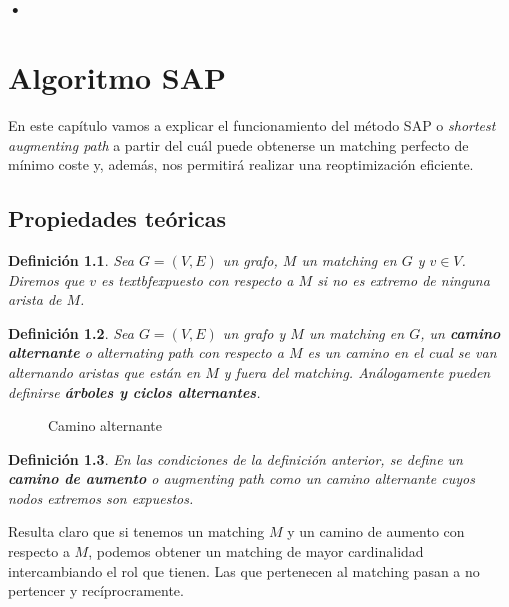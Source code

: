 \documentclass[twoside,a4paper,openright,12pt]{book}
\newtheorem{defi}{Definici\'on}[section]
\begin{document}
\subsection{•}

\chapter{Algoritmo SAP}
En este capítulo vamos a explicar el funcionamiento del método SAP o \textit{shortest augmenting path} a partir del cuál puede obtenerse un matching perfecto de mínimo coste y, además, nos permitirá realizar una reoptimización eficiente.
\section{Propiedades teóricas}
\begin{defi}
Sea $G=(V,E)$ un grafo, $M$ un matching en $G$ y $v\in V$. Diremos que $v$ es textbf{expuesto} con respecto a $M$ si no es extremo de ninguna arista de $M$.
\end{defi}
\begin{defi}
Sea $G=(V,E)$ un grafo y $M$ un matching en $G$, un \textbf{camino alternante} o \textit{alternating path} con respecto a $M$ es un camino en el cual se van alternando aristas que están en $M$ y fuera del matching. Análogamente pueden definirse \textbf{árboles y ciclos alternantes}.
\end{defi}
\begin{figure}[h!]
\centering
{}
\caption{Camino alternante}
\end{figure}

\begin{defi}
En las condiciones de la definición anterior, se define un \textbf{camino de aumento} o \textit{augmenting path} como un camino alternante cuyos nodos extremos son expuestos.
\end{defi}
Resulta claro que si tenemos un matching $M$ y un camino de aumento con respecto a $M$, podemos obtener un matching de mayor cardinalidad intercambiando el rol que tienen. Las que pertenecen al matching pasan a no pertencer y recíprocramente.
\end{document}
